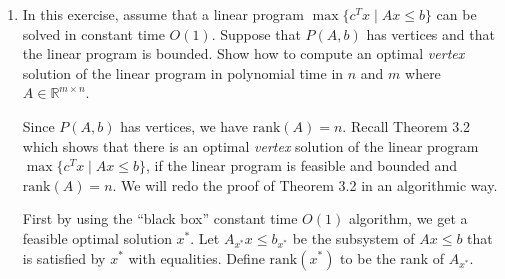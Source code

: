 \documentclass[11pt]{article}
\renewcommand{\leq}{\leqslant}
\newcommand{\rank}{\mathrm{rank}}
\begin{document}
\begin{enumerate}[1)]








\item In this exercise, assume that a linear program $\max\{c^Tx \mid
  Ax\leq b \}$ can be solved in constant time $O(1)$. Suppose that $P(A,b)$
  has vertices and that the linear program is bounded. Show how to
  compute an optimal \emph{vertex} solution of the linear
  program in polynomial time in $n$ and $m$ where $A \in \mathbb{R}^{m \times n}$. 
  
\begin{solution}
Since $P(A,b)$ has vertices, we have $\rank(A) = n$. Recall Theorem 3.2 which shows that there is an optimal \emph{vertex} solution of the linear program $\max\{c^Tx \mid Ax\leq b \}$, if the linear program is feasible and bounded and $\rank(A)=n$.
We will redo the proof of Theorem 3.2 in an algorithmic way.

First by using the ``black box'' constant time $O(1)$ algorithm, we get a feasible optimal solution $x^*$. Let $A_{x^*} x \leq b_{x^*}$ be the subsystem of $Ax\leq b$ that is satisfied by $x^*$ with equalities. Define $\rank(x^*)$ to be the rank of $A_{x^*}$.


\end{solution}
\end{enumerate}
\end{document}
